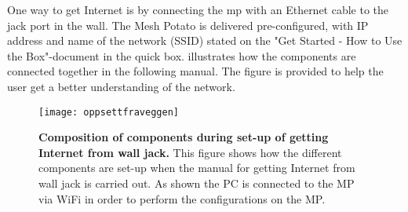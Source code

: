 One way to get Internet is by connecting the \gls{mp} with an Ethernet cable to the jack port in the wall. The Mesh Potato is delivered pre-configured, with IP address and name of the network (SSID) stated on the "Get Started - How to Use the Box"-document in the \gls{quick} box.  illustrates how the components are connected together in the following manual. The figure is provided to help the user get a better understanding of the network.  

\begin{figure}[h!]
  \centering
      \texttt{[image: oppsettfraveggen]}
  \caption [Composition of components during set-up of getting Internet from wall jack]{\textbf{Composition of components during set-up of getting Internet from wall jack.} This figure shows how the different components are set-up when the manual for getting Internet from wall jack is carried out. As shown the PC is connected to the MP via WiFi in order to perform the configurations on the MP.}
  \label{fig:oppsettfraveggen}
\end{figure}



